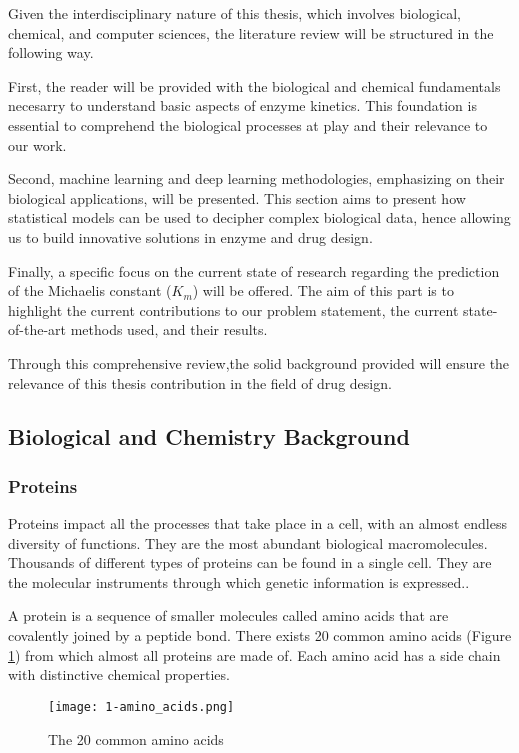 Given the interdisciplinary nature of this thesis, which involves biological, chemical, and 
computer sciences, the literature review will be structured in the following way.

First, the reader will be provided with the biological and chemical fundamentals necesarry to understand basic aspects
of enzyme kinetics. This foundation is essential to comprehend the biological processes at play and
their relevance to our work.

Second, machine learning and deep learning methodologies, emphasizing on their biological
applications, will be presented. This section aims to present how statistical models can be used to decipher complex biological
data, hence allowing us to build innovative solutions in enzyme and drug design.

Finally, a specific focus on the current state of research regarding the prediction of the Michaelis 
constant ($K_m$) will be offered. The aim of this part is to highlight the current contributions to 
our problem statement, the current state-of-the-art methods used, and their results.

Through this comprehensive review,the solid background provided will ensure the relevance of this thesis
contribution in the field of drug design.

\subsection{Biological and Chemistry Background}
\subsubsection{Proteins}
Proteins impact all the processes that take place in a cell, with an almost
endless diversity of functions. They are the most abundant biological macromolecules.
Thousands of different types of proteins can be found in a single cell. They are the molecular
instruments through which genetic information is expressed.\cite{lehninger}.

A protein is a sequence of smaller molecules called amino acids that are covalently joined by a peptide
bond. There exists 20 common amino acids (Figure \ref{fig:20aa}) from which almost all proteins are made of. Each amino acid has
a side chain with distinctive chemical properties.

\begin{figure}
  \centering
  \texttt{[image: 1-amino\_acids.png]}
  \caption{The 20 common amino acids}
  \label{fig:20aa}
\end{figure}

